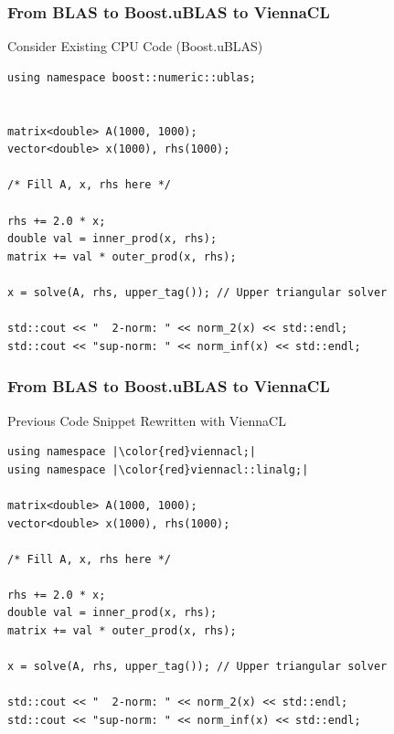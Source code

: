 \begin{frame}[fragile]
\frametitle{From BLAS to Boost.uBLAS to ViennaCL}
\begin{block}{Consider Existing CPU Code (Boost.uBLAS)}
  \begin{lstlisting}
using namespace boost::numeric::ublas;


matrix<double> A(1000, 1000);
vector<double> x(1000), rhs(1000);

/* Fill A, x, rhs here */

rhs += 2.0 * x;
double val = inner_prod(x, rhs);
matrix += val * outer_prod(x, rhs);

x = solve(A, rhs, upper_tag()); // Upper triangular solver

std::cout << "  2-norm: " << norm_2(x) << std::endl;
std::cout << "sup-norm: " << norm_inf(x) << std::endl;
  \end{lstlisting}
\end{block}

\end{frame}

\begin{frame}[fragile]
\frametitle{From BLAS to Boost.uBLAS to ViennaCL}
 \begin{block}{Previous Code Snippet Rewritten with ViennaCL}
  \begin{lstlisting}
using namespace |\color{red}viennacl;|
using namespace |\color{red}viennacl::linalg;|

matrix<double> A(1000, 1000);
vector<double> x(1000), rhs(1000);

/* Fill A, x, rhs here */

rhs += 2.0 * x;
double val = inner_prod(x, rhs);
matrix += val * outer_prod(x, rhs);

x = solve(A, rhs, upper_tag()); // Upper triangular solver

std::cout << "  2-norm: " << norm_2(x) << std::endl;
std::cout << "sup-norm: " << norm_inf(x) << std::endl;
  \end{lstlisting} 
 \end{block}
\end{frame}



